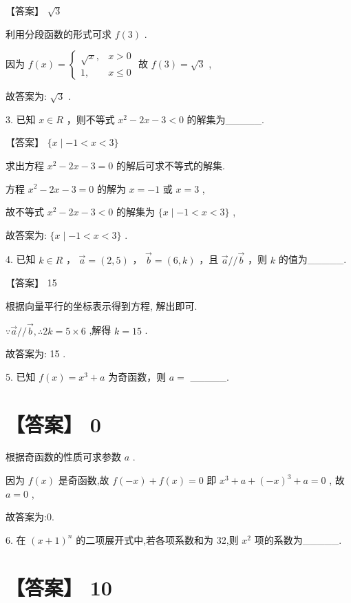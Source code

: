 \documentclass[10pt]{article}
\begin{document}
【答案】 \(\sqrt{3}\)

利用分段函数的形式可求 \(f\left( 3\right)\) .

因为 \(f\left( x\right)  = \left\{  \begin{array}{ll} \sqrt{x}, & x > 0 \\  1, & x \leq  0 \end{array}\right.\) 故 \(f\left( 3\right)  = \sqrt{3}\) ,

故答案为: \(\sqrt{3}\) .

3. 已知 \(x \in  R\) ，则不等式 \({x}^{2} - {2x} - 3 < 0\) 的解集为\_\_\_\_\_.

【答案】 \(\{ x \mid   - 1 < x < 3\}\)

求出方程 \({x}^{2} - {2x} - 3 = 0\) 的解后可求不等式的解集.

方程 \({x}^{2} - {2x} - 3 = 0\) 的解为 \(x =  - 1\) 或 \(x = 3\) ,

故不等式 \({x}^{2} - {2x} - 3 < 0\) 的解集为 \(\{ x \mid   - 1 < x < 3\}\) ,

故答案为: \(\{ x \mid   - 1 < x < 3\}\) .

4. 已知 \(k \in  R\) ， \(\overrightarrow{a} = \left( {2,5}\right)\) ， \(\overrightarrow{b} = \left( {6,k}\right)\) ，且 \(\overrightarrow{a}//\overrightarrow{b}\) ，则 \(k\) 的值为\_\_\_\_\_.

【答案】 15

根据向量平行的坐标表示得到方程, 解出即可.

\(\because \overrightarrow{a}//\overrightarrow{b},\therefore {2k} = 5 \times  6\) ,解得 \(k = {15}\) .

故答案为: 15 .

5. 已知 \(f\left( x\right)  = {x}^{3} + a\) 为奇函数，则 \(a =\) \_\_\_\_\_.

\section*{【答案】 0}

根据奇函数的性质可求参数 \(a\) .

因为 \(f\left( x\right)\) 是奇函数,故 \(f\left( {-x}\right)  + f\left( x\right)  = 0\) 即 \({x}^{3} + a + {\left( -x\right) }^{3} + a = 0\) , 故 \(a = 0\) ,

故答案为:0.

6. 在 \({\left( x + 1\right) }^{n}\) 的二项展开式中,若各项系数和为 32,则 \({x}^{2}\) 项的系数为\_\_\_\_\_.

\section*{【答案】 10}
\end{document}
